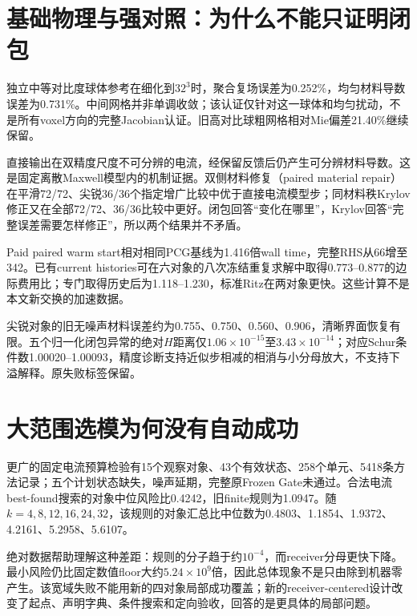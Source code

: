 
\section{基础物理与强对照：为什么不能只证明闭包}
独立中等对比度球体参考在细化到$32^3$时，聚合复场误差为0.252\%，均匀材料导数误差为0.731\%。中间网格并非单调收敛；该认证仅针对这一球体和均匀扰动，不是所有voxel方向的完整Jacobian认证。旧高对比球粗网格相对Mie偏差21.40\%继续保留。

直接输出在双精度尺度不可分辨的电流，经保留反馈后仍产生可分辨材料导数。这是固定离散Maxwell模型内的机制证据。双侧材料修复（paired material repair）在平滑72/72、尖锐36/36个指定增广比较中优于直接电流模型步；同材料秩Krylov修正又在全部72/72、36/36比较中更好。闭包回答“变化在哪里”，Krylov回答“完整误差需要怎样修正”，所以两个结果并不矛盾。

Paid paired warm start相对相同PCG基线为1.416倍wall time，完整RHS从66增至342。已有current histories可在六对象的八次冻结重复求解中取得0.773--0.877的边际费用比；专门取得历史后为1.118--1.230，标准Ritz在两对象更快。这些计算不是本文新交换的加速数据。

尖锐对象的旧无噪声材料误差约为0.755、0.750、0.560、0.906，清晰界面恢复有限。五个归一化闭包异常的绝对$H$距离仅$1.06\times10^{-15}$至$3.43\times10^{-14}$；对应Schur条件数1.00020--1.00093，精度诊断支持近似步相减的相消与小分母放大，不支持下溢解释。原失败标签保留。

\section{大范围选模为何没有自动成功}
更广的固定电流预算检验有15个观察对象、43个有效状态、258个单元、5418条方法记录；五个计划状态缺失，噪声延期，完整原Frozen Gate未通过。合法电流best-found搜索的对象中位风险比0.4242，旧finite规则为1.0947。随$k=4,8,12,16,24,32$，该规则的对象汇总比中位数为0.4803、1.1854、1.9372、4.2161、5.2958、5.6107。

绝对数据帮助理解这种差距：规则的分子趋于约$10^{-4}$，而receiver分母更快下降。最小风险仍比固定数值floor大约$5.24\times10^9$倍，因此总体现象不是只由除到机器零产生。该宽域失败不能用新的四对象局部成功覆盖；新的receiver-centered设计改变了起点、声明字典、条件搜索和定向验收，回答的是更具体的局部问题。
